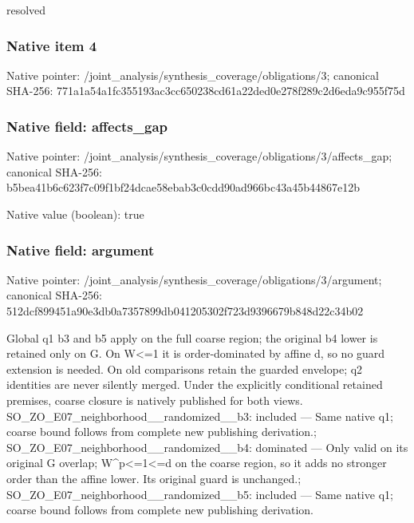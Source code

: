 \documentclass[10pt,a4paper]{article}
\begin{document}
\begingroup\raggedright\sloppy resolved\par\endgroup

\subsubsection{Native item 4}
Native pointer: /joint\_\allowbreak{}analysis/synthesis\_\allowbreak{}coverage/obligations/3; canonical SHA-256: 771a1a54a1fc355193ac3cc650238cd61a22ded0e278f289c2d6eda9c955f75d

\subsubsection{Native field: affects\_\allowbreak{}gap}
Native pointer: /joint\_\allowbreak{}analysis/synthesis\_\allowbreak{}coverage/obligations/3/affects\_\allowbreak{}gap; canonical SHA-256: b5bea41b6c623f7c09f1bf24dcae58ebab3c0cdd90ad966bc43a45b44867e12b

Native value (boolean): true

\subsubsection{Native field: argument}
Native pointer: /joint\_\allowbreak{}analysis/synthesis\_\allowbreak{}coverage/obligations/3/argument; canonical SHA-256: 512dcf899451a90e3db0a7357899db041205302f723d9396679b848d22c34b02

\begingroup\raggedright\sloppy Global q1 b3 and b5 apply on the full coarse region;\allowbreak{} the original b4 lower is retained only on G. On W<=\allowbreak{}1 it is order-dominated by affine d,\allowbreak{} so no guard extension is needed. On old comparisons retain the guarded envelope;\allowbreak{} q2 identities are never silently merged. Under the explicitly conditional retained premises,\allowbreak{} coarse closure is natively published for both views. SO\_\allowbreak{}ZO\_\allowbreak{}E07\_\allowbreak{}neighborhood\_\allowbreak{}\_\allowbreak{}randomized\_\allowbreak{}\_\allowbreak{}b3:\allowbreak{} included {\AtlasUnicodeText —}\allowbreak{} Same native q1;\allowbreak{} coarse bound follows from complete new publishing derivation.;\allowbreak{} SO\_\allowbreak{}ZO\_\allowbreak{}E07\_\allowbreak{}neighborhood\_\allowbreak{}\_\allowbreak{}randomized\_\allowbreak{}\_\allowbreak{}b4:\allowbreak{} dominated {\AtlasUnicodeText —}\allowbreak{} Only valid on its original G overlap;\allowbreak{} W\textasciicircum{}p<=\allowbreak{}1<=\allowbreak{}d on the coarse region,\allowbreak{} so it adds no stronger order than the affine lower. Its original guard is unchanged.;\allowbreak{} SO\_\allowbreak{}ZO\_\allowbreak{}E07\_\allowbreak{}neighborhood\_\allowbreak{}\_\allowbreak{}randomized\_\allowbreak{}\_\allowbreak{}b5:\allowbreak{} included {\AtlasUnicodeText —}\allowbreak{} Same native q1;\allowbreak{} coarse bound follows from complete new publishing derivation.\par\endgroup
\end{document}
